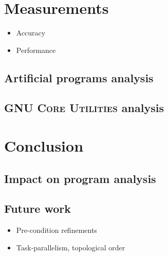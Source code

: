 \documentclass[12pt,oneside,draft]{fithesis2}
\begin{document}
\chapter{Measurements}
\begin{itemize}
  \item Accuracy
  \item Performance
\end{itemize}
\section{Artificial programs analysis}
\section{\textsc{GNU Core Utilities} analysis}


\chapter{Conclusion}
\section{Impact on program analysis}
\section{Future work}
\begin{itemize}
  \item Pre-condition refinements
  \item Task-parallelism, topological order
\end{itemize}



\end{document}
